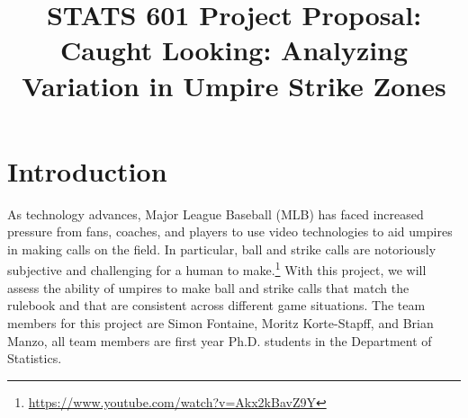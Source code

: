 \documentclass[bj, preprint]{imsart}
\begin{document}
\begin{frontmatter}

\title{{\Large STATS 601 Project Proposal:} \\ 
\bf Caught Looking: Analyzing Variation in Umpire Strike Zones}






\end{frontmatter}



\section{Introduction}\label{sec:intro}
As technology advances, Major League Baseball (MLB) has faced increased pressure from fans, coaches, and players to use video technologies to aid umpires in making calls on the field.
In particular, ball and strike calls are notoriously subjective and challenging for a human to make.\footnote{\url{https://www.youtube.com/watch?v=Akx2kBavZ9Y}}
With this project, we will assess the ability of umpires to make ball and strike calls that match the rulebook and that are consistent across different game situations. 
The team members for this project are Simon Fontaine, Moritz Korte-Stapff, and Brian Manzo, all team members are first year Ph.D. students in the Department of Statistics. 
\end{document}
